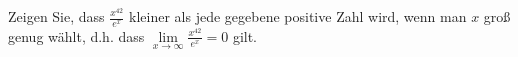 \item
Zeigen Sie, dass $\frac{x^{42}}{e^x}$ kleiner als jede gegebene positive Zahl wird, wenn man $x$ groß genug wählt, d.h. dass $\lim\limits_{x\to\infty} \frac{x^{42}}{e^x} = 0$ gilt. 

